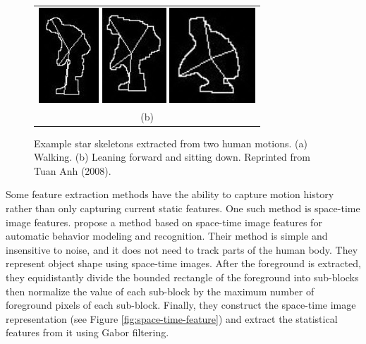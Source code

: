 \begin{figure}[t]
\begin{tabular}{c}
    \includegraphics{figures/star-sit-02.jpg} 
    \includegraphics{figures/star-sit-03.jpg} 
    \includegraphics{figures/star-sit-04.jpg} \\
    (b)
  \end{tabular}
  \caption[Example star skeletons.]{\small Example star skeletons
    extracted from two human motions. (a) Walking. (b) Leaning forward
    and sitting down. Reprinted from Tuan Anh
    (2008)\nocite{anh08thesis}.}
  \label{fig:star-skeleton-example} 
\end{figure}

Some feature extraction methods have the ability to capture motion history
rather than only capturing current static features.  One such method is
space-time image features.  propose a method based on
space-time image features for automatic behavior modeling and recognition.
Their method is simple and insensitive to noise, and it does not need to track
parts of the human body. They represent object shape using space-time images.
After the foreground is extracted, they equidistantly divide the bounded
rectangle of the foreground into sub-blocks then normalize the value of each
sub-block by the maximum number of foreground pixels of each sub-block.
Finally, they construct the space-time image representation (see Figure
\ref{fig:space-time-feature}) and extract the statistical features from it
using Gabor filtering. 

